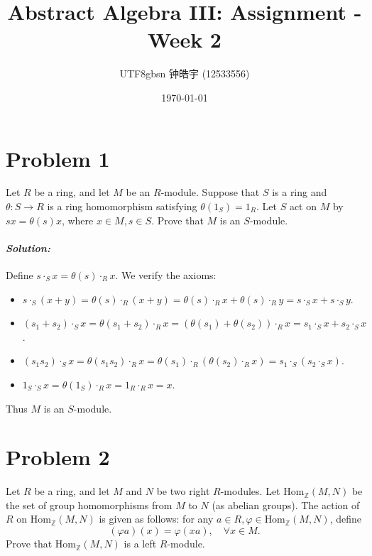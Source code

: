 \documentclass[12pt, a4paper]{article}
\title{Abstract Algebra III: Assignment - Week 2}
\author{
    \begin{CJK*}{UTF8}{gbsn}
    钟皓宇 (12533556)
    \end{CJK*}
}
\date{\today}
\newenvironment{solution}
  {\paragraph{\textit{Solution:}}\par\medskip}
  {\vspace{0.1cm}}
\begin{document}
\maketitle

\section*{Problem 1}
Let $R$ be a ring, and let $M$ be an $R$-module. Suppose that $S$ is a ring and $\theta : S \to R$ is a ring homomorphism satisfying $\theta(1_S) = 1_R$. Let $S$ act on $M$ by $sx = \theta(s)x$, where $x \in M, s \in S$. Prove that $M$ is an $S$-module.

\begin{solution}
Define $s \cdot_S x = \theta(s) \cdot_R x$. We verify the axioms:
\begin{itemize}
    \item $s \cdot_S (x+y) = \theta(s) \cdot_R (x+y) = \theta(s) \cdot_R x + \theta(s) \cdot_R y = s \cdot_S x + s \cdot_S y$.
    \item $(s_1 + s_2) \cdot_S x = \theta(s_1 + s_2) \cdot_R x = (\theta(s_1) + \theta(s_2)) \cdot_R x = s_1 \cdot_S x + s_2 \cdot_S x$.
    \item $(s_1 s_2) \cdot_S x = \theta(s_1 s_2) \cdot_R x = \theta(s_1) \cdot_R (\theta(s_2) \cdot_R x) = s_1 \cdot_S (s_2 \cdot_S x)$.
    \item $1_S \cdot_S x = \theta(1_S) \cdot_R x = 1_R \cdot_R x = x$.
\end{itemize}
Thus $M$ is an $S$-module.
\end{solution}

\section*{Problem 2}
Let $R$ be a ring, and let $M$ and $N$ be two right $R$-modules. Let $\text{Hom}_{\mathbb{Z}}(M, N)$ be the set of group homomorphisms from $M$ to $N$ (as abelian groups). The action of $R$ on $\text{Hom}_{\mathbb{Z}}(M, N)$ is given as follows: for any $a \in R, \varphi \in \text{Hom}_{\mathbb{Z}}(M, N)$, define
\[ (\varphi a)(x) = \varphi(xa), \quad \forall x \in M. \]
Prove that $\text{Hom}_{\mathbb{Z}}(M, N)$ is a left $R$-module.
\end{document}
